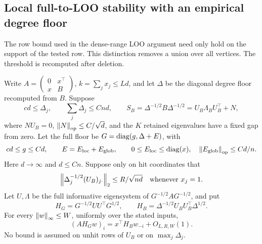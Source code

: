 \subsection{Local full-to-LOO stability with an empirical degree floor}
\label{restore:loo}

The row bound used in the dense-range LOO argument need only hold on
the support of the tested row. This distinction removes a union over
all vertices. The threshold is recomputed after deletion.

\begin{lemma}\label{restore:loo-scalar}
Write $A=\left(\begin{smallmatrix}0&x^\top\\x&B\end{smallmatrix}\right)$,
$k=\sum_jx_j\le Ld$, and let $\Delta$ be the diagonal degree floor
recomputed from $B$. Suppose
\[
 cd\le\Delta_j,\qquad \sum_j\Delta_j\le Cnd,
 \qquad S_B=\Delta^{-1/2}B\Delta^{-1/2}
   =U_B\Lambda_BU_B^\top+N,
\]
where $NU_B=0$, $\left\lVert N\right\rVert_{\mathrm{op}}\le C/\sqrt d$, and the $K$ retained
eigenvalues have a fixed gap from zero. Let the full floor be
$G=\operatorname{diag}(g,\Delta+E)$, with
\[
 cd\le g\le Cd,\qquad E=E_\mathrm{loc}+E_\mathrm{glob},\qquad
 0\le E_\mathrm{loc}\le\operatorname{diag}(x),\quad
 \left\lVert E_\mathrm{glob}\right\rVert_{\mathrm{op}}\le Cd/n.
\]
Here $d\to\infty$ and $d\le Cn$. Suppose only on hit coordinates that
\begin{equation}\label{restore:loo-hit}
 \left\lVert\Delta_j^{-1/2}(U_B)_{j\cdot}\right\rVert_2
       \le R/\sqrt{nd}\quad\text{whenever }x_j=1.
\end{equation}
Let $U,\Lambda$ be the full informative eigensystem of
$G^{-1/2}AG^{-1/2}$, and put
\[
 H_G=G^{-1/2}UU^\top G^{1/2},\qquad
 H_B=\Delta^{-1/2}U_BU_B^\top\Delta^{1/2}.
\]
For every $\left\lVert w\right\rVert_\infty\le W$, uniformly over the stated inputs,
\begin{equation}\label{restore:loo-main}
 (AH_Gw)_i=x^\top H_Bw_{-i}+O_{L,R,W}(1).
\end{equation}
No bound is assumed on unhit rows of $U_B$ or on $\max_j\Delta_j$.
\end{lemma}

